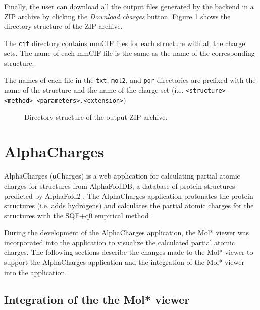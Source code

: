\documentclass[
  digital,     %
  oneside,     %
  nosansbold,  %
  nocolorbold, %
  lof,         %
  lot,         %
]{fithesis4}
\begin{document}
Finally, the user can download all the output files generated by the backend in a ZIP archive by clicking the \textit{Download charges} button. Figure \ref{fig:output_dir_structure} shows the directory structure of the ZIP archive. 

The \texttt{cif} directory contains mmCIF files for each structure with all the charge sets. The name of each mmCIF file is the same as the name of the corresponding structure.

The names of each file in the \texttt{txt}, \texttt{mol2}, and \texttt{pqr} directories are prefixed with the name of the structure and the name of the charge set (i.e. \texttt{<structure>-<method>\_<parameters>.<extension>})

\noindent
\begin{figure}[h]
  \begin{minipage}[t]{10cm}
   \end{minipage}\hfill
\caption{Directory structure of the output ZIP archive.}
\label{fig:output_dir_structure}
\end{figure}

\chapter{AlphaCharges}

AlphaCharges (αCharges) is a web application for calculating partial atomic charges for structures from AlphaFoldDB, a database of protein structures predicted by AlphaFold2 \cite{jumper2021alphafold}. The AlphaCharges application protonates the protein structures (i.e. adds hydrogens) and calculates the partial atomic charges for the structures with the SQE+q0 empirical method \cite{schindler2021sqe}. \cite{schindler2023alphacharges}

During the development of the AlphaCharges application, the Mol* viewer was incorporated into the application to visualize the calculated partial atomic charges. The following sections describe the changes made to the Mol* viewer to support the AlphaCharges application and the integration of the Mol* viewer into the application.

\section{Integration of the the Mol* viewer}
\end{document}
